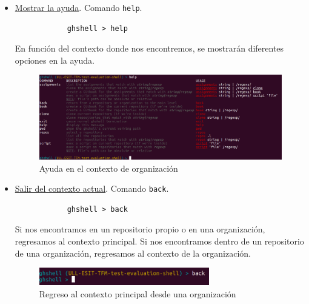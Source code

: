 \begin{itemize}

	\item \underline{Mostrar la ayuda}. Comando \verb|help|.
		
		\begin{verbatim}
			ghshell > help
		\end{verbatim}
		
		En función del contexto donde nos encontremos, se mostrarán diferentes opciones en la ayuda.
		
		\begin{figure}[H]
		\begin{center}
		\includegraphics[width=1\textwidth]{images/help1-2}
		\caption{Ayuda en el contexto de organización}
		\label{fig:help1-2}
		\end{center}
		\end{figure}

\newpage	
	\item \underline{Salir del contexto actual}. Comando \verb|back|.
	
		\begin{verbatim}
			ghshell > back
		\end{verbatim}
		
		Si nos encontramos en un repositorio propio o en una organización, regresamos al contexto principal. 
		Si nos encontramos dentro de un repositorio de una organización, regresamos al contexto de la organización.
		
		\begin{figure}[H]
		\begin{center}
		\includegraphics[width=0.7\textwidth]{images/back1-1}
		\caption{Regreso al contexto principal desde una organización}
		\label{fig:back1-1}
		\end{center}
		\end{figure}
		

\end{itemize}
